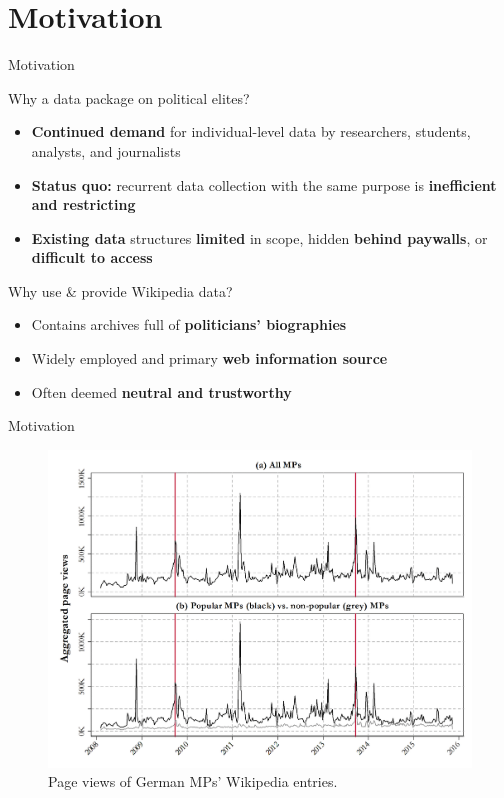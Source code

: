 \section{Motivation}
\begin{frame}{Motivation}
\begin{block}{Why a data package on political elites?}
\begin{itemize}
	\item \textbf{Continued demand} for individual-level data by researchers, students, analysts, and journalists  
	\item \textbf{Status quo:} recurrent data collection with the same purpose is \textbf{inefficient and restricting}
	\item \textbf{Existing data} structures \textbf{limited} in scope, hidden \textbf{behind paywalls}, or \textbf{difficult to access}
\end{itemize}
\pause
\end{block}
\begin{block}{Why use \& provide Wikipedia data?}
\begin{itemize}
	\item Contains archives full of \textbf{politicians' biographies}
	\item Widely employed and primary \textbf{web information source}
	\item Often deemed \textbf{neutral and trustworthy}
\end{itemize}
\end{block}
\end{frame}


\begin{frame}{Motivation}
\begin{figure}[t]
\begin{center}
\vspace{-.1cm}
	\includegraphics[scale=.33]{figure1.pdf}
	\vspace{-.5cm}
	\caption{Page views of German MPs’ Wikipedia entries.}
\end{center}
\end{figure}
\end{frame}

